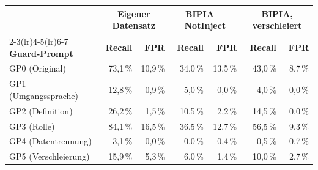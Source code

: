 \setlength{\tabcolsep}{4pt}
\begin{tabular}{l rr rr rr}
\toprule
 & \multicolumn{2}{c}{\textbf{Eigener Datensatz}} & \multicolumn{2}{c}{\textbf{BIPIA + NotInject}} & \multicolumn{2}{c}{\textbf{BIPIA, verschleiert}} \\
\cmidrule(lr){2-3}\cmidrule(lr){4-5}\cmidrule(lr){6-7}
\textbf{Guard-Prompt} & \textbf{Recall} & \textbf{FPR} & \textbf{Recall} & \textbf{FPR} & \textbf{Recall} & \textbf{FPR} \\
\midrule
GP0 (Original) & 73{,}1\,\% & 10{,}9\,\% & 34{,}0\,\% & 13{,}5\,\% & 43{,}0\,\% & 8{,}7\,\% \\
GP1 (Umgangssprache) & 12{,}8\,\% & 0{,}9\,\% & 5{,}0\,\% & 0{,}0\,\% & 4{,}0\,\% & 0{,}0\,\% \\
GP2 (Definition) & 26{,}2\,\% & 1{,}5\,\% & 10{,}5\,\% & 2{,}2\,\% & 14{,}5\,\% & 0{,}0\,\% \\
GP3 (Rolle) & 84{,}1\,\% & 16{,}5\,\% & 36{,}5\,\% & 12{,}7\,\% & 56{,}5\,\% & 9{,}3\,\% \\
GP4 (Datentrennung) & 3{,}1\,\% & 0{,}0\,\% & 0{,}0\,\% & 0{,}4\,\% & 0{,}5\,\% & 0{,}7\,\% \\
GP5 (Verschleierung) & 15{,}9\,\% & 5{,}3\,\% & 6{,}0\,\% & 1{,}4\,\% & 10{,}0\,\% & 2{,}7\,\% \\
\bottomrule
\end{tabular}

